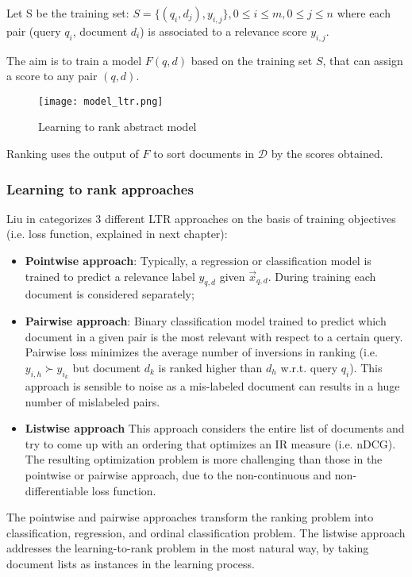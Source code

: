 Let S be the training set: $S=\{(q_i,d_j), y_{i,j}\}, 0 \leq i \leq m,
0 \leq j \leq n$ where each pair (query $q_i$, document $d_i$) is associated to a relevance score $y_{i,j}$.

The aim is to train a model $F(q,d)$ based on the training set $S$, that can assign
a score to any pair $(q,d)$.

\begin{figure}[H]
  \centering
  \texttt{[image: model\_ltr.png]}
  \caption{Learning to rank abstract model}
  \label{fig:model_ltr}
\end{figure}

Ranking uses the output of $F$ to sort documents in $\mathcal{D}$ by the scores obtained.

\subsubsection{Learning to rank approaches}

Liu in \cite{learntorank} categorizes 3 different LTR approaches on the basis of training objectives (i.e. loss function, explained in next chapter):

\begin{itemize}
 \item \textbf{Pointwise approach}: Typically, a regression or classification
model is trained to predict a relevance label $y_{q,d}$ given $\vec{x}_{q,d}$. During training each document is considered separately;
 \item \textbf{Pairwise approach}: Binary classification model trained to
predict which document in a given pair is the most relevant with respect to
a certain query.
Pairwise loss minimizes the average number of inversions in ranking
(i.e. $y_{i,h} \succ y_{i_k}$ but document $d_k$ is ranked higher than
$d_h$ w.r.t. query $q_i$). This approach is sensible to noise as a mis-labeled document
can results in a huge number of mislabeled pairs.
 \item \textbf{Listwise approach} This approach considers the entire list of
documents and try to come up with an ordering that optimizes an IR
measure (i.e. nDCG). The resulting optimization problem is more challenging
than those in the pointwise or pairwise approach, due to the non-continuous
and non-differentiable loss function.
\end{itemize}

The pointwise and pairwise approaches transform the ranking problem into
classification, regression, and ordinal classification problem.
The listwise approach addresses the learning-to-rank problem in the most natural
way, by taking document lists as instances in the learning process.

